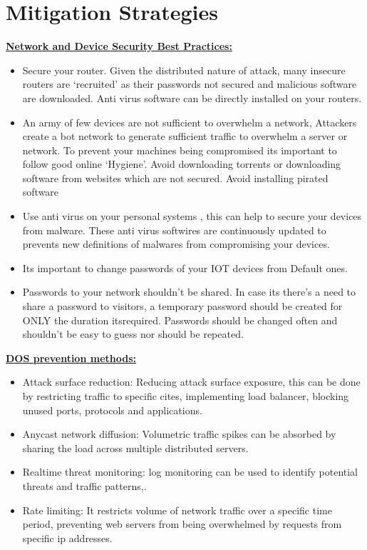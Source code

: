 \documentclass[conference]{IEEEtran}
\begin{document}
\section{Mitigation Strategies}
\underline{\textbf{Network and Device Security Best Practices:}}
\begin{itemize}
\item Secure your router. Given the distributed nature of attack, many insecure routers are ‘recruited’ as their passwords not secured and malicious software are downloaded. Anti virus software can be directly installed on your routers.
\item  An army of few devices are not sufficient to overwhelm a network, Attackers create a bot network to generate sufficient traffic to overwhelm a server or network.  To prevent your machines being compromised its important to follow good online ‘Hygiene’. Avoid downloading torrents or downloading software from websites which are not secured. Avoid installing pirated software
\item Use anti virus on your personal systems , this can help to secure your devices from malware. These anti virus softwires are continuously updated to prevents new definitions of malwares from compromising your devices. 
\item Its important to change passwords of your IOT devices from Default ones. 
\item Passwords to your network shouldn’t be shared. In case its there’s a need to share a password to visitors, a temporary password should be created for ONLY the duration itsrequired. Passwords should be changed often and shouldn’t be easy to guess nor should be repeated.
\\
\end{itemize}
\underline{\textbf{DOS prevention methods:}}
\begin{itemize}
\item  Attack surface reduction: Reducing attack surface exposure, this can be done by restricting traffic to specific cites, implementing load balancer, blocking unused ports, protocols  and applications.
\item Anycast network diffusion: Volumetric traffic spikes can be absorbed by sharing the load across multiple distributed servers.
\item Realtime threat monitoring: log monitoring can be used to identify potential threats and traffic patterns,.
\item Rate limiting: It restricts volume of network traffic over a specific time period, preventing web servers from being overwhelmed by requests from specific ip addresses.
\end{itemize}
\end{document}
